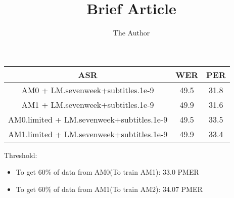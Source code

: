 \documentclass[11pt, oneside]{article}   	%
\title{Brief Article}
\author{The Author}
\begin{document}
\maketitle

\begin{center}
\begin{tabular}{ | c | c | c | }
\hline
\textbf{ASR} & \textbf{WER}  & \textbf{PER} \\ \hline \hline
AM0 + LM.sevenweek+subtitles.1e-9 & 49.5 & 31.8 \\ \hline


AM1 + LM.sevenweek+subtitles.1e-9 & 49.9 & 31.6 \\  \hline
 
 AM0.limited + LM.sevenweek+subtitles.1e-9 & 49.5 & 33.5 \\ \hline
 
 AM1.limited + LM.sevenweek+subtitles.1e-9 & 49.9 & 33.4 \\  \hline
\end{tabular}
\end{center}

Threshold:
\begin{itemize}
\item To get 60\% of data from AM0(To train AM1): 33.0 PMER 
\item To get 60\% of data from AM1(To train AM2): 34.07 PMER
\end{itemize}
\end{document}
